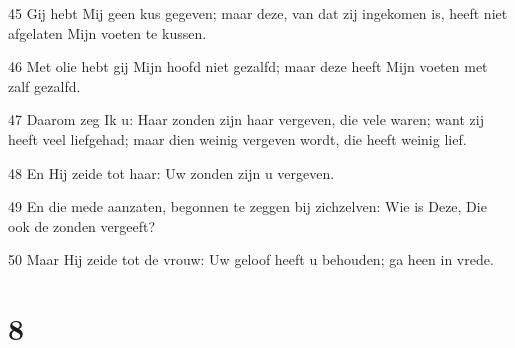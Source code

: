 \par 45 Gij hebt Mij geen kus gegeven; maar deze, van dat zij ingekomen is, heeft niet afgelaten Mijn voeten te kussen.
\par 46 Met olie hebt gij Mijn hoofd niet gezalfd; maar deze heeft Mijn voeten met zalf gezalfd.
\par 47 Daarom zeg Ik u: Haar zonden zijn haar vergeven, die vele waren; want zij heeft veel liefgehad; maar dien weinig vergeven wordt, die heeft weinig lief.
\par 48 En Hij zeide tot haar: Uw zonden zijn u vergeven.
\par 49 En die mede aanzaten, begonnen te zeggen bij zichzelven: Wie is Deze, Die ook de zonden vergeeft?
\par 50 Maar Hij zeide tot de vrouw: Uw geloof heeft u behouden; ga heen in vrede.

\chapter{8}

